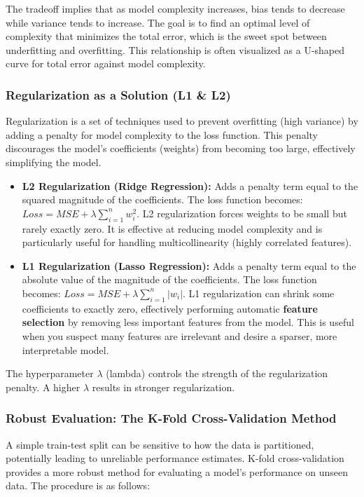 \documentclass[11pt,a4paper]{article}
\begin{document}
The tradeoff implies that as model complexity increases, bias tends to decrease while variance tends to increase. The goal is to find an optimal level of complexity that minimizes the total error, which is the sweet spot between underfitting and overfitting. This relationship is often visualized as a U-shaped curve for total error against model complexity.

\subsubsection{Regularization as a Solution (L1 \& L2)}

Regularization is a set of techniques used to prevent overfitting (high variance) by adding a penalty for model complexity to the loss function. This penalty discourages the model's coefficients (weights) from becoming too large, effectively simplifying the model.

\begin{itemize}
    \item \textbf{L2 Regularization (Ridge Regression):} Adds a penalty term equal to the squared magnitude of the coefficients. The loss function becomes: $Loss = MSE + \lambda\sum_{i=1}^{n}w_{i}^{2}$. L2 regularization forces weights to be small but rarely exactly zero. It is effective at reducing model complexity and is particularly useful for handling multicollinearity (highly correlated features).
    \item \textbf{L1 Regularization (Lasso Regression):} Adds a penalty term equal to the absolute value of the magnitude of the coefficients. The loss function becomes: $Loss = MSE + \lambda\sum_{i=1}^{n}|w_{i}|$. L1 regularization can shrink some coefficients to exactly zero, effectively performing automatic \textbf{feature selection} by removing less important features from the model. This is useful when you suspect many features are irrelevant and desire a sparser, more interpretable model.
\end{itemize}

The hyperparameter $\lambda$ (lambda) controls the strength of the regularization penalty. A higher $\lambda$ results in stronger regularization.

\subsubsection{Robust Evaluation: The K-Fold Cross-Validation Method}

A simple train-test split can be sensitive to how the data is partitioned, potentially leading to unreliable performance estimates. K-fold cross-validation provides a more robust method for evaluating a model's performance on unseen data. The procedure is as follows:
\end{document}
